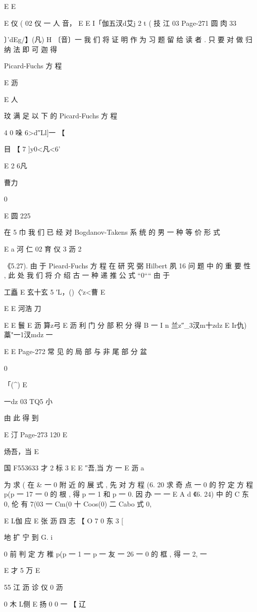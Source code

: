 {{{{{{{{{{{{{{E
E

E 仪 ( 02 仪 一 人 音， E
E I「伽五汊d艾j 2 t ( 技 江 03
Page-271
圆 肉 33

〕'dEg/】(凡) H 〔音〕一
我 们 将 证 明 作 为 习 题 留 给 读 者 . 只 要 对 做 归 纳 法 即 可 迦 得

Picard-Fuchs 方 程

E 沥

E 人

玟
满 足 以 下 的 Picard-Fuchs 方 程

4
0
哚 6>d′′Ll]一 【

目
【 7 ]y0<凡<6'

E 2
6凡

曹力

0

E 圆 225

在 5 巾 我 们 已 经 对 Bogdanov-Takens 系 统 的 男 一 种 等 价 形 式

E a 河 仁 02 育 仪 3 沥 2

《5.27). 由 于 Pieard-Fuchs 方 程 在 研 究 弼 Hilbert 夙 16 问 题 中 的 重
要 性 , 此 处 我 们 将 介 绍 古 一 种 递 推 公 式 “0““ 由 于

工矗
E 玄十玄 5 ′L，()〈′z<曹
E

E
E 河浩 刀

E
E 鬟 E 沥 算z弓 E 沥
利 门 分 部 积 分 得
B 一 I n 兰z″_3汊m十zdz E Ir仇)藁"一1汊mdz 一

E E
Page-272
常 见 的 局 部 与 非 尾 部 分 盆

0

「(^) E

一dz 03
TQ5 小

由 此 得 到

E 汀
Page-273
120 E

炀吾，当 E

国 F553633 才 2 标 3 E E ″吾,当 方 一
E 沥 a

为 求 ( 在 & 一 0 附 近 的 展 式 , 先 对 方 程 (6. 20 求 奇 点 一
0 的 狞 定 方 程 p(p 一 17 一 0 的 根 , 得 p 一 1 和 p 一 0. 因 办 一 一
E A d
《6. 24) 中 的 C 东 0, 伦 有 7(03 一 Cm(0 十 Coos(0) 二 Cabo 式 0,

E L伽 应 E 张 沥 四 志
【 O 7 0 东 3
[

地 扩 宁 到 G.
i

0 前 判 定 方 稚 p(p 一 1 一 p 一 友 一 26 一 0 的 框 , 得 一 2, 一

E 才 5 万 E

55 江 沥 诊 仪 0 沥

0 木 L侧 E 扬
0 0 一
【 辽

}}}}}}}}}}}}}}
